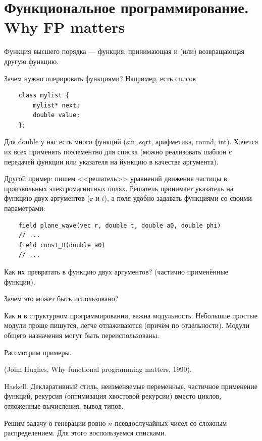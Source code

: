 \documentclass{book}
\begin{document}
\newpage

\section{Функциональное программирование. Why FP matters}

Функция высшего порядка --- функция, принимающая и (или) возвращающая другую функцию.

Зачем нужно оперировать функциями? Например, есть список
\begin{verbatim}
    class mylist {
        mylist* next;
        double value;
    };
\end{verbatim}
Для double у нас есть много функций (sin, sqrt, арифметика, round, int). Хочется их всех применять
поэлементно для списка (можно реализовать шаблон с передачей функции или указателя на йункцию в
качестве аргумента).

Другой пример: пишем <<решатель>> уравнений движения частицы в произвольных электромагнитных полях.
Решатель принимает указатель на функцию двух аргументов ($\mathbf r$ и $t$), а поля удобно задавать
функциями со своими параметрами:
\begin{verbatim}
    field plane_wave(vec r, double t, double a0, double phi)
    // ...
    field const_B(double a0)
    // ...
\end{verbatim}
Как их превратать в функцию двух аргументов? (частично применённые функции).

Зачем это может быть использовано?

Как и в структурном программировании, важна модульность. Небольшие простые модули проще пишутся,
легче отлаживаются (причём по отдельности). Модули общего назначения могут быть переиспользованы. 

Рассмотрим примеры.

(John Hughes, Why functional programming matters, 1990).

Haskell. Декларативный стиль, неизменяемые переменные, частичное применение функций, рекурсия
(оптимизация хвостовой рекурсии) вместо циклов, отложенные вычисления, вывод типов.

Решим задачу о генерации ровно $n$ псевдослучайных чисел со сложным распределением. Для этого
воспользуемся списками.
\end{document}
